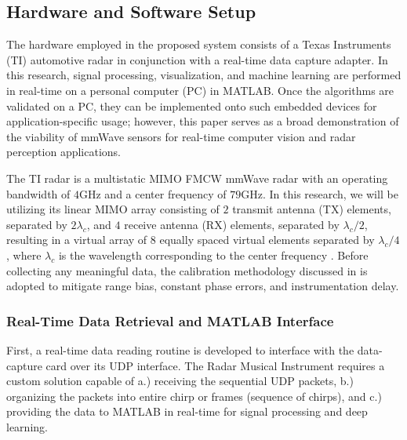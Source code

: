 \documentclass[10pt,journal,final]{IEEEtran}
\begin{document}
\subsection{Hardware and Software Setup}
\label{subsec:hardware_setup_and_challenges}
The hardware employed in the proposed system consists of a Texas Instruments (TI) automotive radar in conjunction with a  real-time data capture adapter. In this research, signal processing, visualization, and machine learning are performed in real-time on a personal computer (PC) in MATLAB. Once the algorithms are validated on a PC, they can be implemented onto such embedded devices for application-specific usage; however, this paper serves as a broad demonstration of the viability of mmWave sensors for real-time computer vision and radar perception applications.

The TI radar is a multistatic MIMO FMCW mmWave radar with an operating bandwidth of $4$GHz and a center frequency of $79$GHz. In this research, we will be utilizing its linear MIMO array consisting of $2$ transmit antenna (TX) elements, separated by $2\lambda_c$, and $4$ receive antenna (RX) elements, separated by $\lambda_c/2$, resulting in a virtual array of 8 equally spaced virtual elements separated by $\lambda_c/4$, where $\lambda_c$ is the wavelength corresponding to the center frequency \cite{ti:intro_to_FMCW_radars}. Before collecting any meaningful data, the calibration methodology discussed in \cite{muhammet:testbeds} is adopted to mitigate range bias, constant phase errors, and instrumentation delay.

\subsubsection{Real-Time Data Retrieval and MATLAB Interface}
\label{subsubsec:real_time_data_retrieval_and_MATLAB_interface}
First, a real-time data reading routine is developed to interface with the data-capture card over its UDP interface. The Radar Musical Instrument requires a custom solution capable of a.) receiving the sequential UDP packets, b.) organizing the packets into entire chirp or frames (sequence of chirps), and c.) providing the data to MATLAB in real-time for signal processing and deep learning. 
\end{document}

